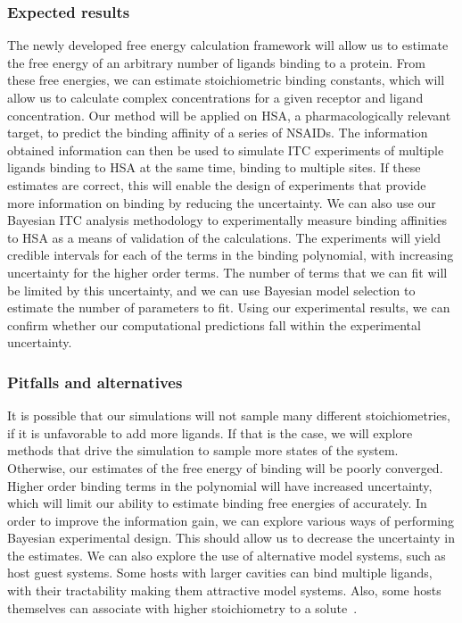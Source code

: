\documentclass[10pt,final]{article}
\begin{document}
\subsubsection*{Expected results}
The newly developed free energy calculation framework will allow us to estimate the free energy of an arbitrary number of ligands binding to a protein.
%
From these free energies, we can estimate stoichiometric binding constants, which will allow us to calculate complex concentrations for a given receptor and ligand concentration.
%
Our method will be applied on HSA, a pharmacologically relevant target, to predict the binding affinity of a series of NSAIDs. 
%
The information obtained information can then be used to simulate ITC experiments of multiple ligands binding to HSA at the same time, binding to multiple sites.
%
If these estimates are correct, this will enable the design of experiments that provide more information on binding by reducing the uncertainty.
%
We can also use our Bayesian ITC analysis methodology to experimentally measure binding affinities to HSA as a means of validation of the calculations.
%
The experiments will yield credible intervals for each of the terms in the binding polynomial, with increasing uncertainty for the higher order terms.
%
The number of terms that we can fit will be limited by this uncertainty, and we can use Bayesian model selection to estimate the number of parameters to fit.
%
Using our experimental results, we can confirm whether our computational predictions fall within the experimental uncertainty.

\subsubsection*{Pitfalls and alternatives}
It is possible that our simulations will not sample many different stoichiometries, if it is unfavorable to add more ligands.
%
If that is the case, we will explore methods that drive the simulation to sample more states of the system.
%
Otherwise, our estimates of the free energy of binding will be poorly converged.
%
Higher order binding terms in the polynomial will have increased uncertainty, which will limit our ability to estimate binding free energies of accurately.
%
In order to improve the information gain, we can explore various ways of performing Bayesian experimental design.
%
This should allow us to decrease the uncertainty in the estimates.
%
We can also explore the use of alternative model systems, such as host guest systems. 
%
Some hosts with larger cavities can bind multiple ligands, with their tractability making them attractive model systems.
%
Also, some hosts themselves can associate with higher stoichiometry to a solute~\autocite{Armstrong1986a}.
\end{document}
